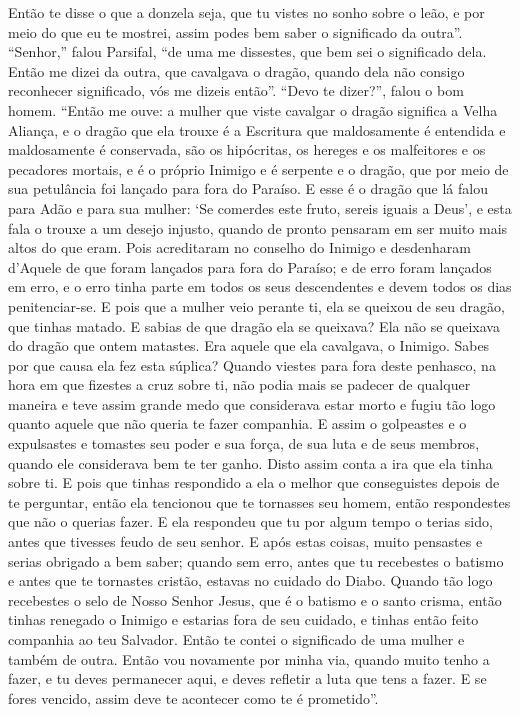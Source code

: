 Então te disse o que a donzela seja, que tu vistes no sonho sobre o leão, e
por meio do que eu te mostrei, assim podes bem saber o significado da outra”. 
“Senhor,” falou Parsifal, “de uma me dissestes, que bem sei
o significado dela. Então me dizei da outra, que cavalgava o dragão, quando
dela não consigo reconhecer significado, vós me dizeis então”. “Devo te
dizer?”, falou o bom homem. “Então me ouve: a mulher que viste cavalgar o
dragão significa a Velha Aliança, e o dragão que ela trouxe é a Escritura que
maldosamente é entendida e maldosamente é conservada, são os hipócritas, os
hereges e os malfeitores e os pecadores mortais, e é o próprio Inimigo e é
serpente e o dragão, que por meio de sua petulância foi lançado para fora do
Paraíso. E esse é o dragão que lá falou para Adão e para sua mulher: ‘Se
comerdes este fruto, sereis iguais a Deus’, e esta fala o trouxe a um desejo
injusto, quando de pronto pensaram em ser muito mais altos do que eram. Pois
acreditaram no conselho do Inimigo e desdenharam d’Aquele de que foram lançados
para fora do Paraíso; e de erro foram lançados em erro, e o erro tinha parte em
todos os seus descendentes e devem todos os dias penitenciar-se. E pois que a
mulher veio perante ti, ela se queixou de seu dragão, que tinhas matado. E
sabias de que dragão ela se queixava? Ela não se queixava do dragão que ontem
matastes. Era aquele que ela cavalgava, o Inimigo. Sabes por que causa ela fez
esta súplica? Quando viestes para fora deste penhasco, na hora em que fizestes
a cruz sobre ti, não podia mais se padecer de qualquer maneira e teve assim
grande medo que considerava estar morto e fugiu tão logo quanto aquele que não
queria te fazer companhia. E assim o golpeastes e o expulsastes e tomastes seu
poder e sua força, de sua luta e de seus membros, quando ele considerava bem te
ter ganho. Disto assim conta a ira que ela tinha sobre ti. E pois que tinhas
respondido a ela o melhor que conseguistes depois de te perguntar, então ela
tencionou que te tornasses seu homem, então respondestes que não o querias
fazer. E ela respondeu que tu por algum tempo o terias sido, antes que tivesses
feudo de seu senhor. E após estas coisas, muito pensastes e serias obrigado a
bem saber; quando sem erro, antes que tu recebestes o batismo e antes que te
tornastes cristão, estavas no cuidado do Diabo. Quando tão logo recebestes o
selo de Nosso Senhor Jesus, que é o batismo e o santo crisma, então tinhas
renegado o Inimigo e estarias fora de seu cuidado, e tinhas então feito
companhia ao teu Salvador. Então te contei o significado de uma mulher e também
de outra. Então vou novamente por minha via, quando muito tenho a fazer, e tu
deves permanecer aqui, e deves refletir a luta que tens a fazer. E se fores
vencido, assim deve te acontecer como te é prometido”. 

